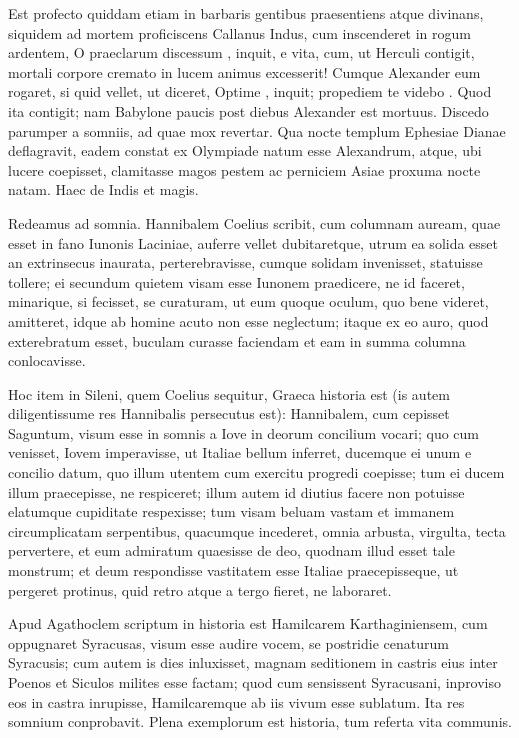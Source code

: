  Est profecto quiddam etiam in barbaris gentibus praesentiens atque divinans, siquidem ad mortem proficiscens Callanus Indus, cum inscenderet in rogum ardentem, O praeclarum discessum , inquit, e vita, cum, ut Herculi contigit, mortali corpore cremato in lucem animus excesserit! Cumque Alexander eum rogaret, si quid vellet, ut diceret, Optime , inquit; propediem te videbo . Quod ita contigit; nam Babylone paucis post diebus Alexander est mortuus. Discedo parumper a somniis, ad quae mox revertar. Qua nocte templum Ephesiae Dianae deflagravit, eadem constat ex Olympiade natum esse Alexandrum, atque, ubi lucere coepisset, clamitasse magos pestem ac perniciem Asiae proxuma nocte natam. Haec de Indis et magis.

 Redeamus ad somnia. Hannibalem Coelius scribit, cum columnam auream, quae esset in fano Iunonis Laciniae, auferre vellet dubitaretque, utrum ea solida esset an extrinsecus inaurata, perterebravisse, cumque solidam invenisset, statuisse tollere; ei secundum quietem visam esse Iunonem praedicere, ne id faceret, minarique, si fecisset, se curaturam, ut eum quoque oculum, quo bene videret, amitteret, idque ab homine acuto non esse neglectum; itaque ex eo auro, quod exterebratum esset, buculam curasse faciendam et eam in summa columna conlocavisse.

 Hoc item in Sileni, quem Coelius sequitur, Graeca historia est (is autem diligentissume res Hannibalis persecutus est): Hannibalem, cum cepisset Saguntum, visum esse in somnis a Iove in deorum concilium vocari; quo cum venisset, Iovem imperavisse, ut Italiae bellum inferret, ducemque ei unum e concilio datum, quo illum utentem cum exercitu progredi coepisse; tum ei ducem illum praecepisse, ne respiceret; illum autem id diutius facere non potuisse elatumque cupiditate respexisse; tum visam beluam vastam et immanem circumplicatam serpentibus, quacumque incederet, omnia arbusta, virgulta, tecta pervertere, et eum admiratum quaesisse de deo, quodnam illud esset tale monstrum; et deum respondisse vastitatem esse Italiae praecepisseque, ut pergeret protinus, quid retro atque a tergo fieret, ne laboraret.

 Apud Agathoclem scriptum in historia est Hamilcarem Karthaginiensem, cum oppugnaret Syracusas, visum esse audire vocem, se postridie cenaturum Syracusis; cum autem is dies inluxisset, magnam seditionem in castris eius inter Poenos et Siculos milites esse factam; quod cum sensissent Syracusani, inproviso eos in castra inrupisse, Hamilcaremque ab iis vivum esse sublatum. Ita res somnium conprobavit. Plena exemplorum est historia, tum referta vita communis.

